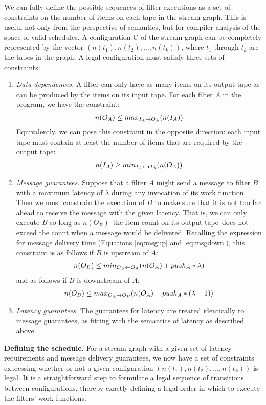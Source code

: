 We can fully define the possible sequences of filter executions as a
set of constraints on the number of items on each tape in the stream
graph.  This is useful not only from the perspective of semantics, but
for compiler analysis of the space of valid schedules.  A
configuration C of the stream graph can be completely represented by
the vector $(n(t_1), n(t_2), \dots, n(t_k))$, where $t_1$ through
$t_k$ are the tapes in the graph.  A legal configuration must satisfy
three sets of constraints:
\begin{enumerate}
\item {\it Data dependences.}  A filter can only have as many items on
its output tape as can be produced by the items on its input tape.
For each filter $A$ in the program, we have the constraint:
\begin{align*}
n(O_A) \le max_{I_A \rightarrow O_A}(n(I_A))
\end{align*}
Equivalently, we can pose this constraint in the opposite direction:
each input tape must contain at least the number of items that are
required by the output tape:
\begin{align*}
n(I_A) \ge min_{I_A \leftarrow O_A}(n(O_A))
\end{align*}
\item {\it Message guarantees.}  Suppose that a filter $A$ might send
a message to filter $B$ with a maximum latency of $\lambda$ during any
invocation of its work function.  Then we must constrain the execution
of $B$ to make sure that it is not too far ahead to receive the
message with the given latency.  That is, we can only execute $B$ so
long as $n(O_B)$--the item count on its output tape--does not exceed
the count when a message would be delivered.  Recalling the expression
for message delivery time (Equations \ref{eq:msgup} and
\ref{eq:msgdown}), this constraint is as follows if $B$ is upstream of $A$:
\begin{align*}
n(O_B) \le min_{O_B \leftarrow O_A}(n(O_A) + push_A * \lambda)
\end{align*}
and as follows if $B$ is downstream of $A$:
\begin{align*}
n(O_B) \le max_{O_A \rightarrow O_B}(n(O_A) + push_A * (\lambda-1))
\end{align*}
\item {\it Latency guarantees.}  The guarantees for latency are
treated identically to message guarantees, as fitting with the
semantics of latency as described above.
\end{enumerate}
{\bf Defining the schedule.}  For a stream graph with a given set of
latency requirements and message delivery guarantees, we now have a
set of constraints expressing whether or not a given configuration
$(n(t_1), n(t_2), \dots, n(t_k))$ is legal.  It is a straightforward
step to formulate a legal sequence of transitions between
configurations, thereby exactly defining a legal order in which to
execute the filters' work functions.


